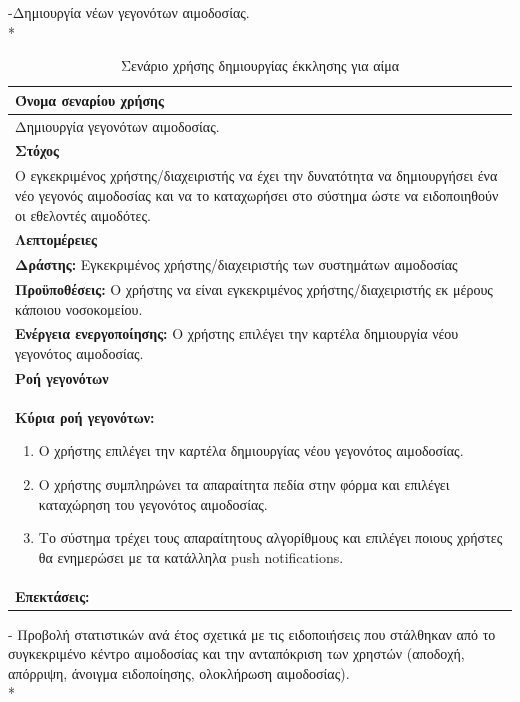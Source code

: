 -Δημιουργία νέων γεγονότων αιμοδοσίας.
\\*
\begin{table}[H]
	\begin{center}
	    \begin{tabular}{|p{\dimexpr \linewidth-2\tabcolsep}|}
	    \hline
	    \rowcolor{grayy}
	    \textbf{Όνομα σεναρίου χρήσης}
	    \\ \hline    
	    Δημιουργία γεγονότων αιμοδοσίας.
	     \\ \hline
	    \rowcolor{grayy}
	    \textbf{\textbf{Στόχος}}
	    \\ \hline
	 	 Ο εγκεκριμένος χρήστης/διαχειριστής να έχει την δυνατότητα να δημιουργήσει ένα νέο γεγονός αιμοδοσίας και να το καταχωρήσει στο σύστημα ώστε να ειδοποιηθούν οι εθελοντές αιμοδότες.
	    \\ \hline
	    \rowcolor{grayy}
	    \textbf{Λεπτομέρειες}
	    \\ \hline
		\textbf{Δράστης:} Εγκεκριμένος χρήστης/διαχειριστής των συστημάτων αιμοδοσίας
		\\*
		\textbf{Προϋποθέσεις:} Ο χρήστης να είναι εγκεκριμένος χρήστης/διαχειριστής εκ μέρους κάποιου νοσοκομείου.
		\\*
		\textbf{Ενέργεια ενεργοποίησης:} Ο χρήστης επιλέγει την καρτέλα δημιουργία νέου γεγονότος αιμοδοσίας.
		\\ \hline
		\rowcolor{grayy}    
	    \textbf{Ροή γεγονότων}
	    \\ \hline
		\textbf{Κύρια ροή γεγονότων:}
		\begin{enumerate}
		\item	 Ο χρήστης επιλέγει την καρτέλα δημιουργίας νέου γεγονότος αιμοδοσίας.
		\item Ο χρήστης συμπληρώνει τα απαραίτητα πεδία στην φόρμα και επιλέγει καταχώρηση του γεγονότος αιμοδοσίας.
		\item Το σύστημα τρέχει τους απαραίτητους αλγορίθμους και επιλέγει ποιους χρήστες θα ενημερώσει με τα κατάλληλα push notifications.
		\end{enumerate}
		\\ \hline
		\textbf{Επεκτάσεις:}
		   \\ \hline
	    \end{tabular}
	    \caption{Σενάριο χρήσης δημιουργίας έκκλησης για αίμα}
	    \label{tab:create_blood_donor_event} 
	\end{center}
\end{table}


- Προβολή στατιστικών ανά έτος σχετικά με τις ειδοποιήσεις που στάλθηκαν από το συγκεκριμένο κέντρο αιμοδοσίας και την ανταπόκριση των χρηστών (αποδοχή, απόρριψη, άνοιγμα ειδοποίησης, ολοκλήρωση αιμοδοσίας).
\\*


